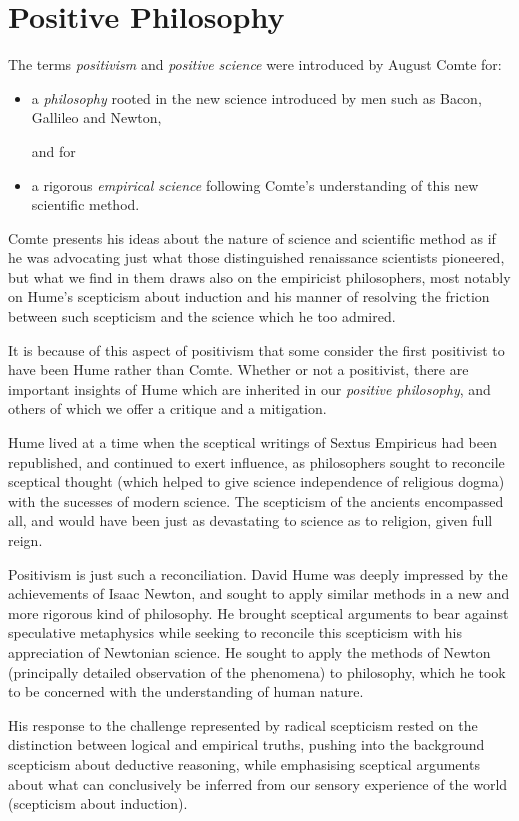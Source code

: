 \section{Positive Philosophy}

The terms {\it positivism} and {\it positive science} were introduced by August Comte for:
\begin{itemize}
\item a {\it philosophy} rooted in the new science introduced by men such as Bacon, Gallileo and Newton,

and for
\item a rigorous {\it empirical science} following Comte's understanding of this new scientific method.
\end{itemize}

Comte presents his ideas about the nature of science and scientific method as if he was advocating just what those distinguished renaissance scientists pioneered, but what we find in them draws also on the empiricist philosophers, most notably on Hume's scepticism about induction and his manner of resolving the friction between such scepticism and the science which he too admired.

It is because of this aspect of positivism that some consider the first positivist to have been Hume rather than Comte.
Whether or not a positivist, there are important insights of Hume which are inherited in our {\it positive philosophy}, and others of which we offer a critique and a mitigation.

Hume lived at a time when the sceptical writings of Sextus Empiricus had been republished,
and continued to exert influence, as philosophers sought to reconcile sceptical thought (which helped to give science independence of religious dogma) with the sucesses of modern science.
The scepticism of the ancients encompassed all, and would have been just as devastating to science as to religion, given full reign.

Positivism is just such a reconciliation.
David Hume was deeply impressed by the achievements of Isaac Newton, and sought to apply similar methods in a new and more rigorous kind of philosophy.
He brought sceptical arguments to bear against speculative metaphysics while seeking to reconcile this scepticism with his appreciation of Newtonian science.
He sought to apply the methods of Newton (principally detailed observation of the phenomena) to philosophy, which he took to be concerned with the understanding of human nature.

His response to the challenge represented by radical scepticism rested on the distinction between logical and empirical truths, pushing into the background scepticism about deductive reasoning, while emphasising sceptical
arguments about what can conclusively be inferred from our sensory experience of the world (scepticism about induction).

